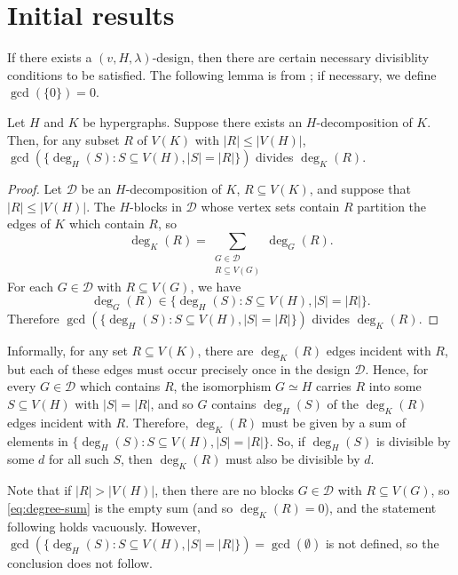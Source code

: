 \section{Initial results}

If there exists a $(v, H, \lambda)$-design, then there are certain necessary divisiblity conditions to be satisfied.
The following lemma is from \cite{bryant}; if necessary, we define $\gcd(\{0\}) = 0$.

\begin{lemma} \label{obv-necessary-1}
Let $H$ and $K$ be hypergraphs. Suppose there exists an $H$-decomposition of $K$.
Then, for any subset $R$ of $V(K)$ with $|R| \leq |V(H)|$,
$\gcd(\{\deg_H(S) : S \subseteq V(H), |S| = |R|\})$ divides $\deg_K(R)$.
\end{lemma}

\begin{proof}
Let $\mathcal{D}$ be an $H$-decomposition of $K$, $R \subseteq V(K)$, and suppose that $|R| \leq |V(H)|$.
The $H$-blocks in $\mathcal{D}$ whose vertex sets contain $R$ partition the edges of $K$ which contain $R$, so
\begin{equation} \label{eq:degree-sum}
    \deg_K(R) = \sum_{\substack{G \in \mathcal{D} \\ R \subseteq V(G)}} \deg_G(R).
\end{equation}
For each $G \in \mathcal{D}$ with $R \subseteq V(G)$, we have
\[
    \deg_G(R) \in \{\deg_H(S) : S \subseteq V(H), |S| = |R|\}.
\]
Therefore $\gcd(\{\deg_H(S) : S \subseteq V(H), |S| = |R|\})$ divides $\deg_K(R)$.
\end{proof}

Informally, for any set $R \subseteq V(K)$, there are $\deg_K(R)$ edges incident with $R$,
but each of these edges must occur precisely once in the design $\mathcal{D}$.
Hence, for every $G \in \mathcal{D}$ which contains $R$, the isomorphism $G \simeq H$
carries $R$ into some $S \subseteq V(H)$ with $|S| = |R|$, and so $G$ contains
$\deg_H(S)$ of the $\deg_K(R)$ edges incident with $R$.
Therefore, $\deg_K(R)$ must be given by a sum of elements in $\{\deg_H(S) : S \subseteq V(H), |S| = |R|\}$.
So, if $\deg_H(S)$ is divisible by some $d$ for all such $S$, then $\deg_K(R)$ must also be divisible by $d$.

Note that if $|R| > |V(H)|$, then there are no blocks $G \in \mathcal{D}$ with $R \subseteq V(G)$,
so \eqref{eq:degree-sum} is the empty sum (and so $\deg_K(R) = 0$), and the statement following holds vacuously.
However, $\gcd(\{\deg_H(S) : S \subseteq V(H), |S| = |R|\}) = \gcd(\emptyset)$ is not defined,
so the conclusion does not follow.

